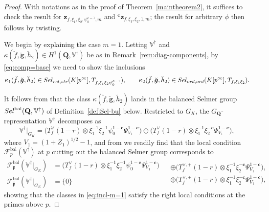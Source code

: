 \documentclass[10pt,letterpaper]{amsart}
\theoremstyle{plain}
\theoremstyle{definition}
\theoremstyle{definition}
\theoremstyle{plain}
\theoremstyle{plain}
\theoremstyle{plain}
\theoremstyle{remark}
\numberwithin{equation}{section}
\newcommand{\cc}{\mathbf{c}}
\newcommand{\ch}{\xi}
\newcommand{\Sel}{Sel}
\newcommand{\pp}{\mathfrak{p}}
\newcommand{\ppbar}{\bar{\mathfrak{p}}}
\newcommand{\relstr}{{{\rm rel},{\rm str}}}
\newcommand{\ord}{{{\rm ord},{\rm ord}}}
\DeclareMathOperator{\bal}{\mathrm{bal}}
\newcommand{\Q}{\mathbf{Q}}
\def\Sel{{\rm Sel}}
\newcommand{\bfg}{{\boldsymbol{g}}}
\begin{document}
\begin{proof}
With notations as in the proof of Theorem~\ref{maintheorem2}, it suffices to check the result for $\mathbf{z}_{f,\xi_1,\xi_2,\psi_0^{\cc-1},m}$ and ${}^\cc\mathbf{z}_{f,\xi_1,\xi_2,1,m}$; the result for arbitrary $\phi$ then follows by twisting. 

We begin by explaining the case $m=1$. %
Letting $\mathbb{V}^\dagger$ and $\kappa(\breve{f},\breve{\boldsymbol{\bfg}},\breve{h}_2)\in H^1(\Q,\mathbb{V}^\dagger)$ be as in Remark~\ref{rem:diag-components}, by \eqref{eq:comp=base} we need to show the inclusions
\begin{equation}\label{eq:incl-m=1}
\kappa_1(\breve{f},\breve{\boldsymbol{\bfg}},\breve{h}_2)\in\Sel_{\relstr}(K[p^\infty],T_{f,\xi_1\xi_2\psi_0^{\cc-1}}),\quad\quad
\kappa_2(\breve{f},\breve{\boldsymbol{\bfg}},\breve{h}_2)\in\Sel_{\ord}(K[p^\infty],T_{f,\xi_1\xi_2}).
\end{equation}

It follows from \cite[Cor.~8.2]{BSV} that the class  $\kappa(\breve{f},\breve{\boldsymbol{\bfg}},\breve{h}_2)$ lands in the balanced Selmer group $\Sel^{\bal}(\Q,\mathbb{V}^\dagger)$ of Definition~\ref{def:Sel-bu} below. Restricted to $G_K$, the $G_\Q$-representation $\mathbb{V}^\dagger$ decomposes as
\begin{equation}\label{eq:split-V}
\mathbb{V}^\dagger\vert_{G_K}=\bigl(T_f^\vee(1-r)\otimes\ch_1^{-1}\ch_2^{-1}\psi_0^{1-\cc}\Psi_{V_1}^{1-\cc}\bigr)\oplus\bigl(T_f^\vee(1-r)\otimes\ch_1^{-1}\ch_2^{-\cc}\Psi_{V_1}^{1-\cc}\bigr),
\end{equation}
where $V_1=(1+Z_1)^{1/2}-1$, and %
from %
we readily find that the local condition $\mathscr{F}_p^{\bal}(\mathbb{V}^\dagger)$ at $p$ cutting out the balanced Selmer group corresponds to
\begin{equation}\label{eq:bal-pp}
\begin{split}
\mathscr{F}_\pp^{\bal}(\mathbb{V}^\dagger\vert_{G_K})&=\bigl(T_f^\vee(1-r)\otimes\ch_1^{-1}\ch_2^{-1}\psi_0^{1-\cc}\Psi_{V_1}^{1-\cc}\bigr)\\
\mathscr{F}_{\ppbar}^{\bal}(\mathbb{V}^\dagger\vert_{G_K})&=\{0\}
\end{split}
\begin{split}
&\oplus\bigl(T_f^{\vee,+}(1-r)\otimes\ch_1^{-1}\ch_2^{-\cc}\Psi_{V_1}^{1-\cc}\bigr),\\
&\oplus\bigl(T_f^{\vee,+}(1-r)\otimes\ch_1^{-1}\ch_2^{-\cc}\Psi_{V_1}^{1-\cc}\bigr),
\end{split}
\end{equation}
showing that the classes in \eqref{eq:incl-m=1} satisfy the right local conditions at the primes above $p$. 


\end{proof}
\end{document}
